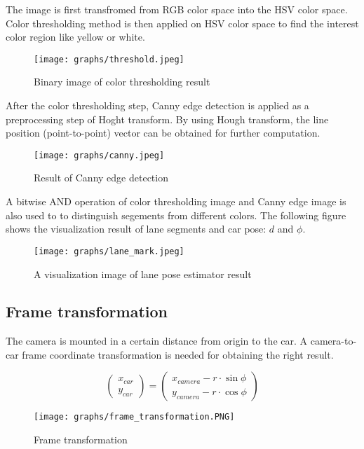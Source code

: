 \documentclass{article}
\begin{document}
\noindent The image is first transfromed from RGB color space into the HSV color space. Color thresholding method is then applied on HSV color space to find the interest color region like yellow or white.

\begin{figure}[ht]
  \label{fig:threshold}
  \centering
  \texttt{[image: graphs/threshold.jpeg]}
  \caption{Binary image of color thresholding result}
\end{figure}
\FloatBarrier

\noindent After the color thresholding step, Canny edge detection is applied as a preprocessing step of Hoght transform. By using Hough transform, the line position (point-to-point) vector can be obtained for further computation.

\begin{figure}[ht]
  \label{fig:canny}
  \centering
  \texttt{[image: graphs/canny.jpeg]}
  \caption{Result of Canny edge detection}
\end{figure}
\FloatBarrier

\noindent A bitwise AND operation of color thresholding image and Canny edge image is also used to to distinguish segements from different colors. The following figure shows the visualization result of lane segments and car pose: $d$ and $\phi$.

\begin{figure}[ht]
  \label{fig:hough}
  \centering
  \texttt{[image: graphs/lane\_mark.jpeg]}
  \caption{A visualization image of lane pose estimator result}
\end{figure}
\FloatBarrier


\subsection{Frame transformation}

The camera is mounted in a certain distance from origin to the car. A camera-to-car frame coordinate transformation is needed for obtaining the right result.

\[
\begin{pmatrix} x_{car} \\ y_{car} \end{pmatrix} = 
\begin{pmatrix} x_{camera} - r \cdot \sin\phi \\ y_{camera} - r \cdot \cos\phi \end{pmatrix}
\]

\begin{figure}[ht]
  \label{fig:frame_transformation}
  \centering
  \texttt{[image: graphs/frame\_transformation.PNG]}
  \caption{Frame transformation}
\end{figure}
\FloatBarrier
\end{document}
